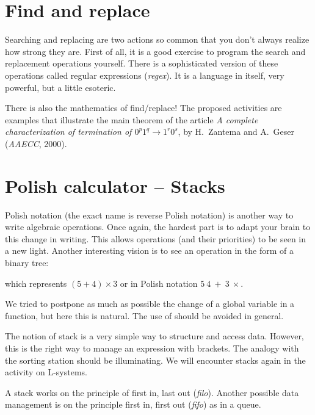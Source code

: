 \documentclass[11pt,class=report,crop=false]{standalone}
\begin{document}
\section{Find and replace}

Searching and replacing are two actions so common that you don't always realize how strong they are.
First of all, it is a good exercise to program the search and replacement operations yourself. There is a sophisticated version of these operations called regular expressions (\emph{regex}). It is a language in itself, very powerful, but a little esoteric.

There is also the mathematics of \og{}find/replace\fg{}! The proposed activities are examples that illustrate the main theorem of the article \emph{A complete characterization of termination of $0^p1^q \rightarrow 1^r0^s$}, by H.~Zantema and A.~Geser (\emph{AAECC}, 2000).



\section{Polish calculator -- Stacks}

Polish notation (the exact name is \og{}reverse Polish notation\fg{}) is another way to write algebraic operations. Once again, the hardest part is to adapt your brain to this change in writing. This allows operations (and their priorities) to be seen in a new light. Another interesting vision is to see an operation in the form of a binary tree:

which represents $(5 + 4) \times 3$ or in Polish notation $5 \ 4 \ +\  3 \ \times$.

We tried to postpone as much as possible the change of a global variable in a function, but here this is natural. The use of  should be avoided in general.

The notion of stack is a very simple way to structure and access data.
However, this is the right way to manage an expression with brackets. The analogy with the sorting station should be illuminating. 
We will encounter stacks again in the activity on L-systems.


A stack works on the principle of \og{}first in, last out\fg{} (\emph{filo}). Another possible data management is on the principle \og{}first in, first out\fg{} (\emph{fifo}) as in a queue.
\end{document}
